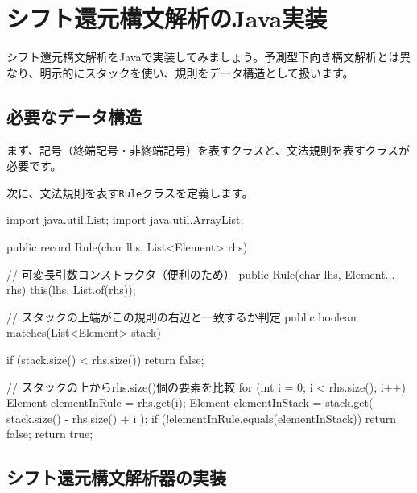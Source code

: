 \section{シフト還元構文解析のJava実装}

シフト還元構文解析をJavaで実装してみましょう。予測型下向き構文解析とは異なり、明示的にスタックを使い、規則をデータ構造として扱います。

\subsection{必要なデータ構造}

まず、記号（終端記号・非終端記号）を表すクラスと、文法規則を表すクラスが必要です。


次に、文法規則を表す\texttt{Rule}クラスを定義します。

\begin{codescreen}{}
import java.util.List;
import java.util.ArrayList;

public record Rule(char lhs, List<Element> rhs) {
    // 可変長引数コンストラクタ（便利のため）
    public Rule(char lhs, Element... rhs) {
        this(lhs, List.of(rhs));
    }
    
    // スタックの上端がこの規則の右辺と一致するか判定
    public boolean matches(List<Element> stack) {
        if (stack.size() < rhs.size()) return false;
        
        // スタックの上からrhs.size()個の要素を比較
        for (int i = 0; i < rhs.size(); i++) {
            Element elementInRule = rhs.get(i);
            Element elementInStack = stack.get(
                stack.size() - rhs.size() + i
            );
            if (!elementInRule.equals(elementInStack)) {
                return false;
            }
        }
        return true;
    }
}
\end{codescreen}

\subsection{シフト還元構文解析器の実装}

